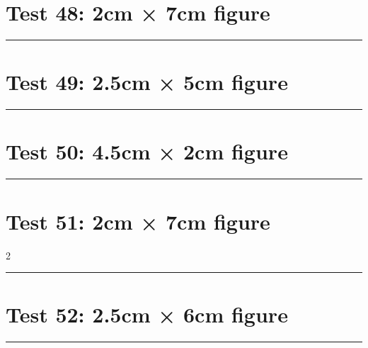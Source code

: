 \documentclass[a4paper,11pt]{article}
\begin{document}
\section*{Test 48: 2cm × 7cm figure}
\begin{swarmwrap}%
  \begin{minipage}[t]{2cm}
    \centering
    \rule{\linewidth}{7cm}
  \end{minipage}%
\end{swarmwrap}%
\swarmwrapnext
\lipsum[143]
\lipsum[144]
\lipsum[145]
\section*{Test 49: 2.5cm × 5cm figure}
\begin{swarmwrap}%
  \begin{minipage}[t]{2cm}
    \centering
    \rule{\linewidth}{5cm}
  \end{minipage}%
\end{swarmwrap}%
\swarmwrapnext
\lipsum[20]
\lipsum[21]
\lipsum[22]
\section*{Test 50: 4.5cm × 2cm figure}
\begin{swarmwrap}%
  \begin{minipage}[t]{4cm}
    \centering
    \rule{\linewidth}{2cm}
  \end{minipage}%
\end{swarmwrap}%
\swarmwrapnext
\lipsum[19]
\lipsum[20]
\lipsum[21]
\lipsum[22]
\section*{Test 51: 2cm × 7cm figure}
\begin{multicols}{2}
  \begin{swarmwrap}%
    \begin{minipage}[t]{2cm}
      \centering
      \rule{\linewidth}{7cm}
    \end{minipage}%
  \end{swarmwrap}%
  \swarmwrapnext
  \lipsum[133]
  \lipsum[134]
  \lipsum[135]
\end{multicols}
\section*{Test 52: 2.5cm × 6cm figure}
\begin{swarmwrap}%
  \begin{minipage}[t]{2cm}
    \centering
    \rule{\linewidth}{6cm}
  \end{minipage}%
\end{swarmwrap}%
\swarmwrapnext
\lipsum[56]
\lipsum[57]
\lipsum[58]
\lipsum[59]
\lipsum[60]
\lipsum[61]
\end{document}
